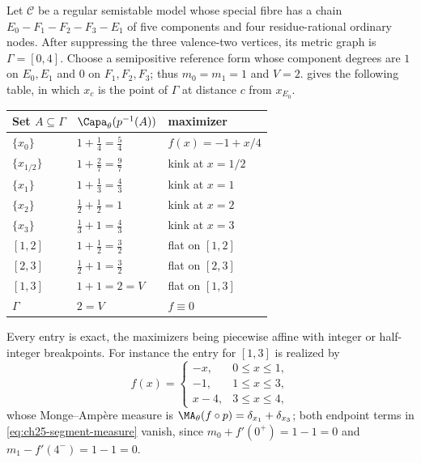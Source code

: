 \begin{example}
\label{ex:ch25-segment-capacities}
Let $\mathcal C$ be a regular semistable model whose special fibre has a
chain $E_0-F_1-F_2-F_3-E_1$ of five components and four residue-rational
ordinary nodes.
After suppressing the three valence-two vertices, its metric graph is
$\Gamma=[0,4]$.  Choose a semipositive reference form whose component
degrees are $1$ on $E_0,E_1$ and $0$ on $F_1,F_2,F_3$; thus
$m_0=m_1=1$ and $V=2$.  
gives the following table, in which $x_c$ is the point of $\Gamma$ at
distance $c$ from $x_{E_0}$.

\begin{center}
\small
\begin{tabular}{l|l|l}
\toprule
\textbf{Set }$A\subseteq\Gamma$&$\Capa_\theta(p^{-1}(A))$
 &\textbf{maximizer}\\
\midrule
$\{x_0\}$&$1+\tfrac14=\tfrac54$&$f(x)=-1+x/4$\\
$\{x_{1/2}\}$&$1+\tfrac27=\tfrac97$&kink at $x=1/2$\\
$\{x_1\}$&$1+\tfrac13=\tfrac43$&kink at $x=1$\\
$\{x_2\}$&$\tfrac12+\tfrac12=1$&kink at $x=2$\\
$\{x_3\}$&$\tfrac13+1=\tfrac43$&kink at $x=3$\\
$[1,2]$&$1+\tfrac12=\tfrac32$&flat on $[1,2]$\\
$[2,3]$&$\tfrac12+1=\tfrac32$&flat on $[2,3]$\\
$[1,3]$&$1+1=2=V$&flat on $[1,3]$\\
$\Gamma$&$2=V$&$f\equiv0$\\
\bottomrule
\end{tabular}
\end{center}

Every entry is exact, the maximizers being piecewise affine with integer or
half-integer breakpoints.  For instance the entry for $[1,3]$ is realized
by
\[
 f(x)=\begin{cases}-x,&0\leq x\leq1,\\ -1,&1\leq x\leq3,\\
  x-4,&3\leq x\leq4,\end{cases}
\]
whose Monge--Amp\`ere measure is
$\MA_\theta(f\circ p)=\delta_{x_1}+\delta_{x_3}$; both endpoint terms in
\eqref{eq:ch25-segment-measure} vanish, since
$m_0+f'(0^+)=1-1=0$ and $m_1-f'(4^-)=1-1=0$.


\end{example}
